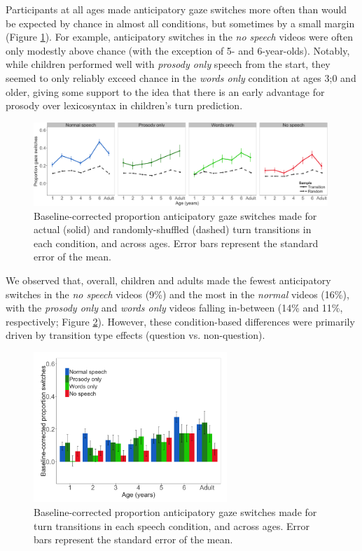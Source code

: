 \documentclass[authoryear, 12pt]{elsarticle}
\begin{document}
Participants at all ages made anticipatory gaze switches more often than would be expected by chance in almost all conditions, but sometimes by a small margin (Figure \ref{fig:randvsrealEN}). For example, anticipatory switches in the \textit{no speech} videos were often only modestly above chance (with the exception of 5- and 6-year-olds). Notably, while children performed well with \textit{prosody only} speech from the start, they seemed to only reliably exceed chance in the \textit{words only} condition at ages 3;0 and older, giving some support to the idea that there is an early advantage for prosody over lexicosyntax in children's turn prediction.

\begin{figure}[t]
\begin{center}
\includegraphics[width=0.99\textwidth]{figures/FIG-randvsreal-EN.png}
\end{center}
\caption{Baseline-corrected proportion anticipatory gaze switches made for actual (solid) and randomly-shuffled (dashed) turn transitions in each condition, and across ages. Error bars represent the standard error of the mean.} 
\label{fig:randvsrealEN}
\end{figure}

We observed that, overall, children and adults made the fewest anticipatory switches in the \textit{no speech} videos (9\%) and the most in the \textit{normal} videos (16\%), with the \textit{prosody only} and \textit{words only} videos falling in-between (14\% and 11\%, respectively; Figure \ref{fig:conditionsEN}). However, these condition-based differences were primarily driven by transition type effects (question vs. non-question).

\begin{figure}[t]
\begin{center}
\includegraphics[width=0.65\textwidth]{figures/FIG-conditions-EN.png}
\end{center}
\caption{Baseline-corrected proportion anticipatory gaze switches made for turn transitions in each speech condition, and across ages. Error bars represent the standard error of the mean.} 
\label{fig:conditionsEN}
\end{figure}
\end{document}
